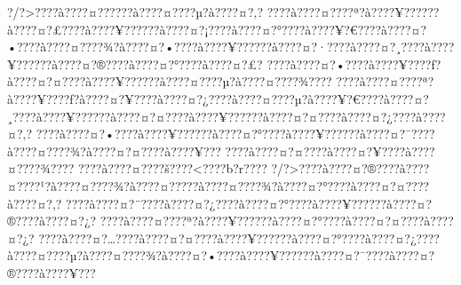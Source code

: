 \documentclass[11pt, openany]{book}
\begin{document}
{{{{{{{{{{{{{{{{{{{{{{{{{{{{{{{{{{{{{{{{{{{{{{{{{{{{{{{{{{{{{{{{{{{{{{{{{{{{{{{{{{{{{{{{{{{{{{{{{{{{{{{{{{{{{?/?\textgreater{}???\textbar{}?à???\textbar{}?¤?????\textbar{}?à???\textbar{}?¤???\textbar{}?µ?à???\textbar{}?¤?‚?
???\textbar{}?à???\textbar{}?¤???\textbar{}?ª?à???\textbar{}?¥?????\textbar{}?à???\textbar{}?¤?£???\textbar{}?à???\textbar{}?¥?????\textbar{}?à???\textbar{}?¤?¡???\textbar{}?à???\textbar{}?¤?°???\textbar{}?à???\textbar{}?¥?€???\textbar{}?à???\textbar{}?¤?•???\textbar{}?à???\textbar{}?¤???\textbar{}?¾?à???\textbar{}?¤?•???\textbar{}?à???\textbar{}?¥?????\textbar{}?à???\textbar{}?¤?·???\textbar{}?à???\textbar{}?¤?¸???\textbar{}?à???\textbar{}?¥?????\textbar{}?à???\textbar{}?¤?®???\textbar{}?à???\textbar{}?¤?°???\textbar{}?à???\textbar{}?¤?£?
???\textbar{}?à???\textbar{}?¤?•???\textbar{}?à???\textbar{}?¥???\textbar{}?ƒ?à???\textbar{}?¤?¤???\textbar{}?à???\textbar{}?¥?????\textbar{}?à???\textbar{}?¤???\textbar{}?µ?à???\textbar{}?¤???\textbar{}?¾???\textbar{}?
???\textbar{}?à???\textbar{}?¤???\textbar{}?ª?à???\textbar{}?¥???\textbar{}?ƒ?à???\textbar{}?¤?¥???\textbar{}?à???\textbar{}?¤?¿???\textbar{}?à???\textbar{}?¤???\textbar{}?µ?à???\textbar{}?¥?€???\textbar{}?à???\textbar{}?¤?¸???\textbar{}?à???\textbar{}?¥?????\textbar{}?à???\textbar{}?¤?¤???\textbar{}?à???\textbar{}?¥?????\textbar{}?à???\textbar{}?¤?¤???\textbar{}?à???\textbar{}?¤?¿???\textbar{}?à???\textbar{}?¤?‚?
???\textbar{}?à???\textbar{}?¤?•???\textbar{}?à???\textbar{}?¥?????\textbar{}?à???\textbar{}?¤?°???\textbar{}?à???\textbar{}?¥?????\textbar{}?à???\textbar{}?¤?¯???\textbar{}?à???\textbar{}?¤???\textbar{}?¾?à???\textbar{}?¤?¤???\textbar{}?à???\textbar{}?¥???
???\textbar{}?à???\textbar{}?¤?¤???\textbar{}?à???\textbar{}?¤?¥???\textbar{}?à???\textbar{}?¤???\textbar{}?¾???\textbar{}?
???\textbar{}?à???\textbar{}?¤???\textbar{}?š???\textbar{}?\textless{}???\textbar{}?b?r???\textbar{}?
?/?\textgreater{}???\textbar{}?à???\textbar{}?¤?®???\textbar{}?à???\textbar{}?¤???\textbar{}?¹?à???\textbar{}?¤???\textbar{}?¾?à???\textbar{}?¤?­???\textbar{}?à???\textbar{}?¤???\textbar{}?¾?à???\textbar{}?¤?°???\textbar{}?à???\textbar{}?¤?¤???\textbar{}?à???\textbar{}?¤?‚?
???\textbar{}?à???\textbar{}?¤?¨???\textbar{}?à???\textbar{}?¤?¿???\textbar{}?à???\textbar{}?¤?°???\textbar{}?à???\textbar{}?¥?????\textbar{}?à???\textbar{}?¤?®???\textbar{}?à???\textbar{}?¤?¿?
???\textbar{}?à???\textbar{}?¤???\textbar{}?ª?à???\textbar{}?¥?????\textbar{}?à???\textbar{}?¤?°???\textbar{}?à???\textbar{}?¤?¤???\textbar{}?à???\textbar{}?¤?¿?
???\textbar{}?à???\textbar{}?¤?\ldots{}???\textbar{}?à???\textbar{}?¤?¤???\textbar{}?à???\textbar{}?¥?????\textbar{}?à???\textbar{}?¤?°???\textbar{}?à???\textbar{}?¤?¿???\textbar{}?à???\textbar{}?¤???\textbar{}?µ?à???\textbar{}?¤???\textbar{}?¾?à???\textbar{}?¤?•???\textbar{}?à???\textbar{}?¥?????\textbar{}?à???\textbar{}?¤?¯???\textbar{}?à???\textbar{}?¤?®???\textbar{}?à???\textbar{}?¥???
}}}}}}}}}}}}}}}}}}}}}}}}}}}}}}}}}}}}}}}}}}}}}}}}}}}}}}}}}}}}}}}}}}}}}}}}}}}}}}}}}}}}}}}}}}}}}}}}}}}}}}}}}}}}}
\end{document}
